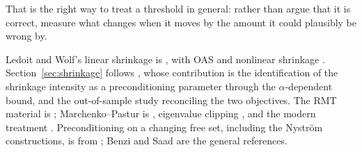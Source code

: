 That is the right way to treat a threshold in general: rather than argue that it is
correct, measure what changes when it moves by the amount it could plausibly be wrong
by.

\begin{notes}
Ledoit and Wolf's linear shrinkage is \cite{ledoit2004}, with OAS \cite{chen2010} and
nonlinear shrinkage \cite{ledoit2020}. Section~\ref{sec:shrinkage} follows
\cite{schmelzer2026matrixfree}, whose contribution is the identification of the
shrinkage intensity as a preconditioning parameter through the $\alpha$-dependent
bound, and the out-of-sample study reconciling the two objectives. The RMT material is
\cite{schmelzer2026rmt}; Marchenko--Pastur is \cite{marchenko1967}, eigenvalue clipping
\cite{laloux1999}, and the modern treatment \cite{bun2017}. Preconditioning on a
changing free set, including the Nyström constructions, is from
\cite{schmelzer2026nncg}; Benzi \cite{benzi2005} and Saad \cite{saad2003iterative} are
the general references.
\end{notes}

